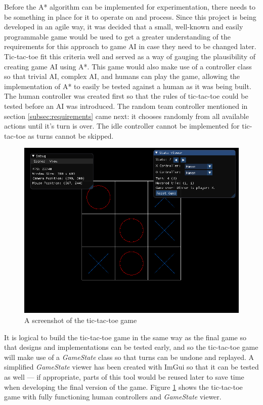 \documentclass[11pt, a4paper]{report}
\begin{document}
Before the A* algorithm can be implemented for experimentation, there needs to be something in place for it to operate on and process. Since this project is being developed in an agile way, it was decided that a small, well-known and easily programmable game would be used to get a greater understanding of the requirements for this approach to game AI in case they need to be changed later. Tic-tac-toe fit this criteria well and served as a way of gauging the plausibility of creating game AI using A*. This game would also make use of a controller class so that trivial AI, complex AI, and humans can play the game, allowing the implementation of A* to easily be tested against a human as it was being built. The human controller was created first so that the rules of tic-tac-toe could be tested before an AI was introduced. The random team controller mentioned in section \ref{subsec:requirements} came next: it chooses randomly from all available actions until it's turn is over. The idle controller cannot be implemented for tic-tac-toe as turns cannot be skipped.

\begin{figure}[!h]
  \centering
  \includegraphics[width=\linewidth]{img/tictactoe_game.png}
  \caption{A screenshot of the tic-tac-toe game}
  \label{fig:ticTacToeGame}
\end{figure}

It is logical to build the tic-tac-toe game in the same way as the final game so that designs and implementations can be tested early, and so the tic-tac-toe game will make use of a \emph{GameState} class so that turns can be undone and replayed. A simplified \emph{GameState} viewer has been created with ImGui so that it can be tested as well --- if appropriate, parts of this tool would be reused later to save time when developing the final version of the game. Figure \ref{fig:ticTacToeGame} shows the tic-tac-toe game with fully functioning human controllers and \emph{GameState} viewer.
\end{document}
